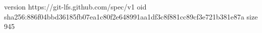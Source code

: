 version https://git-lfs.github.com/spec/v1
oid sha256:886f04bbd36185fb07ea1c80f2e648991aa1df3c8f881cc89cf3e721b381e87a
size 945
